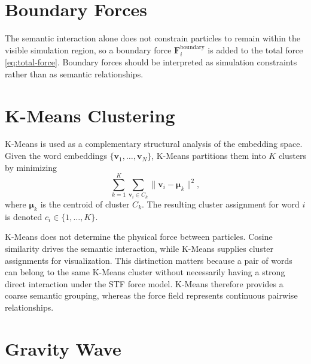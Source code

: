 \documentclass[11pt]{amsart}
\begin{document}
\section{Boundary Forces}

The semantic interaction alone does not constrain particles to remain within
the visible simulation region, so a boundary force
$\mathbf{F}_i^{\mathrm{boundary}}$ is added to the total force
\eqref{eq:total-force}. Boundary forces should be interpreted as simulation
constraints rather than as semantic relationships.

\section{K-Means Clustering}

K-Means is used as a complementary structural analysis of the embedding space.
Given the word embeddings $\{\mathbf{v}_1, \ldots, \mathbf{v}_N\}$, K-Means
partitions them into $K$ clusters by minimizing
\[
\sum_{k=1}^{K} \sum_{\mathbf{v}_i \in C_k}
\|\mathbf{v}_i - \boldsymbol{\mu}_k\|^2,
\]
where $\boldsymbol{\mu}_k$ is the centroid of cluster $C_k$. The resulting
cluster assignment for word $i$ is denoted $c_i \in \{1, \ldots, K\}$.

K-Means does not determine the physical force between particles. Cosine
similarity drives the semantic interaction, while K-Means supplies cluster
assignments for visualization. This distinction matters because a pair of words
can belong to the same K-Means cluster without necessarily having a strong
direct interaction under the STF force model. K-Means therefore provides a
coarse semantic grouping, whereas the force field represents continuous
pairwise relationships.

\section{Gravity Wave}
\end{document}

